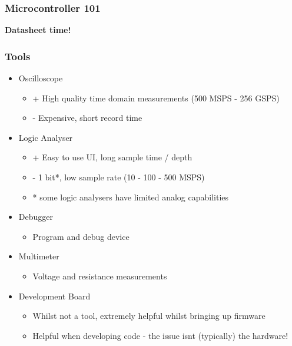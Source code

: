 \documentclass[t]{beamer}
\begin{document}

\begin{frame}[t]
\frametitle{Microcontroller 101}
\textbf{Datasheet time!} 

\end{frame}



\begin{frame}[t]
\frametitle{Tools}
\begin{itemize}
	\item Oscilloscope
	\begin{itemize}
		\item + High quality time domain measurements (500 MSPS - 256 GSPS)
		\item - Expensive, short record time
	\end{itemize} 	
	\item Logic Analyser
	\begin{itemize}
		\item + Easy to use UI, long sample time / depth
		\item - 1 bit*, low sample rate (10 - 100 - 500 MSPS)
		\item * some logic analysers have limited analog capabilities 
	\end{itemize} 
	\item Debugger
	\begin{itemize}
		\item Program and debug device
	\end{itemize} 
	\item Multimeter
	\begin{itemize}
		\item Voltage and resistance measurements
	\end{itemize} 
	\item Development Board
	\begin{itemize}
		\item Whilst not a tool, extremely helpful whilst bringing up firmware
		\item Helpful when developing code - the issue isnt (typically) the hardware!
	\end{itemize} 
\end{itemize} 
\end{frame}

\end{document}
